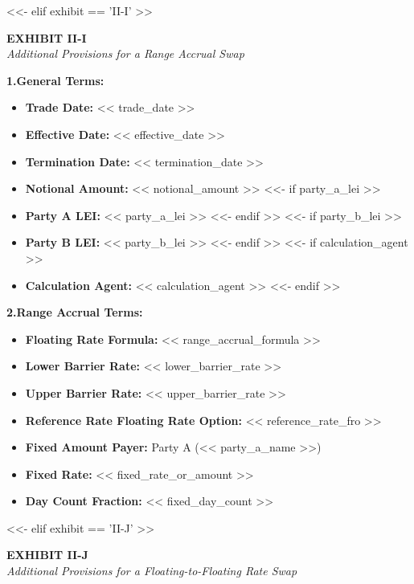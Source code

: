 \documentclass[11pt, a4paper]{article}
\begin{document}
<<- elif exhibit == 'II-I' >>
\begin{center}
    \textbf{EXHIBIT II-I} \\
    \textit{Additional Provisions for a Range Accrual Swap}
\end{center}

\vspace{0.3cm}
\noindent \textbf{1.\quad General Terms:}
\begin{itemize}[leftmargin=2cm, label={}, itemsep=3pt]
    \item \textbf{Trade Date:} << trade_date >>
    \item \textbf{Effective Date:} << effective_date >>
    \item \textbf{Termination Date:} << termination_date >>
    \item \textbf{Notional Amount:} << notional_amount >>
<<- if party_a_lei >>
    \item \textbf{Party A LEI:} << party_a_lei >>
<<- endif >>
<<- if party_b_lei >>
    \item \textbf{Party B LEI:} << party_b_lei >>
<<- endif >>
<<- if calculation_agent >>
    \item \textbf{Calculation Agent:} << calculation_agent >>
<<- endif >>
\end{itemize}

\vspace{0.3cm}
\noindent \textbf{2.\quad Range Accrual Terms:}
\begin{itemize}[leftmargin=2cm, label={}, itemsep=3pt]
    \item \textbf{Floating Rate Formula:} << range_accrual_formula >>
    \item \textbf{Lower Barrier Rate:} << lower_barrier_rate >>
    \item \textbf{Upper Barrier Rate:} << upper_barrier_rate >>
    \item \textbf{Reference Rate Floating Rate Option:} << reference_rate_fro >>
    \item \textbf{Fixed Amount Payer:} Party A (<< party_a_name >>)
    \item \textbf{Fixed Rate:} << fixed_rate_or_amount >>
    \item \textbf{Day Count Fraction:} << fixed_day_count >>
\end{itemize}

<<- elif exhibit == 'II-J' >>
\begin{center}
    \textbf{EXHIBIT II-J} \\
    \textit{Additional Provisions for a Floating-to-Floating Rate Swap}
\end{center}
\end{document}
